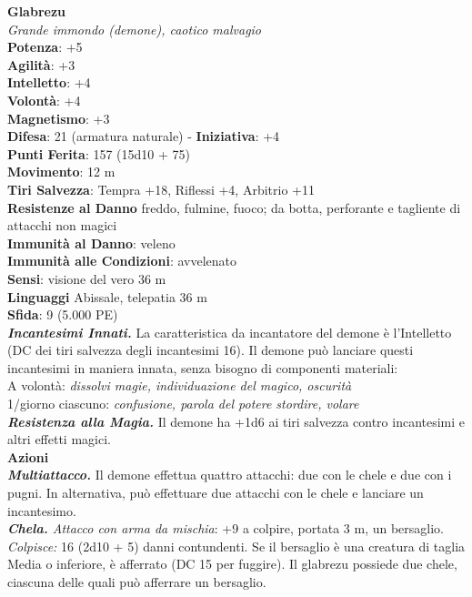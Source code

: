 \begin{multicols}{2}
\medskip\textbf{Glabrezu}\\
\emph{Grande immondo (demone), caotico malvagio}\\
\textbf{Potenza}: +5\\
\textbf{Agilità}: +3\\
\textbf{Intelletto}: +4\\
\textbf{Volontà}: +4\\
\textbf{Magnetismo}: +3\\
\textbf{Difesa}: 21 (armatura naturale) - \textbf{Iniziativa}: +4\\
\textbf{Punti Ferita}: 157 (15d10 + 75)\\
\textbf{Movimento}: 12 m\\
\textbf{Tiri Salvezza}: Tempra +18, Riflessi +4, Arbitrio +11\\
\textbf{Resistenze al Danno} freddo, fulmine, fuoco; da botta, perforante e tagliente di attacchi non magici\\
\textbf{Immunità al Danno}: veleno\\
\textbf{Immunità alle Condizioni}: avvelenato\\
\textbf{Sensi}: visione del vero 36 m\\
\textbf{Linguaggi} Abissale, telepatia 36 m \\
\textbf{Sfida}: 9 (5.000 PE)\smallskip\\
\emph{\textbf{Incantesimi Innati.}} La caratteristica da incantatore del demone è l'Intelletto (DC dei tiri salvezza degli incantesimi 16). Il demone può lanciare questi incantesimi in maniera innata, senza bisogno di componenti materiali:\\
A volontà: \emph{dissolvi magie, individuazione del magico, oscurità}\\
1/giorno ciascuno: \emph{confusione, parola del potere stordire, volare}\\
\emph{\textbf{Resistenza alla Magia.}} Il demone ha +1d6 ai tiri salvezza contro  incantesimi e altri effetti magici. \\
\smallskip\textbf{Azioni}\\
\emph{\textbf{Multiattacco.}} Il demone effettua quattro attacchi: due con le chele e due con i pugni. In alternativa, può effettuare due attacchi con le chele e lanciare un incantesimo.\\
\emph{\textbf{Chela.} Attacco con arma da mischia}: +9 a colpire, portata 3 m, un bersaglio.\\
\emph{Colpisce:} 16 (2d10 + 5) danni contundenti. Se il bersaglio è una creatura di taglia Media o inferiore, è afferrato (DC 15 per fuggire). Il glabrezu possiede due chele, ciascuna delle quali può afferrare un bersaglio.\\

\end{multicols}
